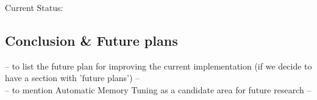 \documentclass[8pt,mathserif,a4paper,oneside,pdf]{beamer}
\begin{document}
\begin{frame}[fragile]{Current Status:}
\end{frame}

\subsection[Conclusion \& Future plans - Automatic Memory Tuning]{Conclusion \& Future plans}
\begin{frame}
  -- to list the future plan for improving the current implementation  (if we decide to have a section with 'future plans') --\\
  -- to mention Automatic Memory Tuning as a candidate area for future research --\\
\end{frame}


\end{document}
